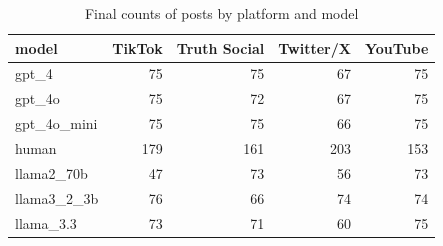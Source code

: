 \begin{table}

\caption{Final counts of posts by platform and model}
\centering
\begin{tabular}[t]{lrrrr}
\toprule
model & TikTok & Truth Social & Twitter/X & YouTube\\
\midrule
gpt\_4 & 75 & 75 & 67 & 75\\
gpt\_4o & 75 & 72 & 67 & 75\\
gpt\_4o\_mini & 75 & 75 & 66 & 75\\
human & 179 & 161 & 203 & 153\\
llama2\_70b & 47 & 73 & 56 & 73\\
\addlinespace
llama3\_2\_3b & 76 & 66 & 74 & 74\\
llama\_3.3 & 73 & 71 & 60 & 75\\
\bottomrule
\end{tabular}
\end{table}
